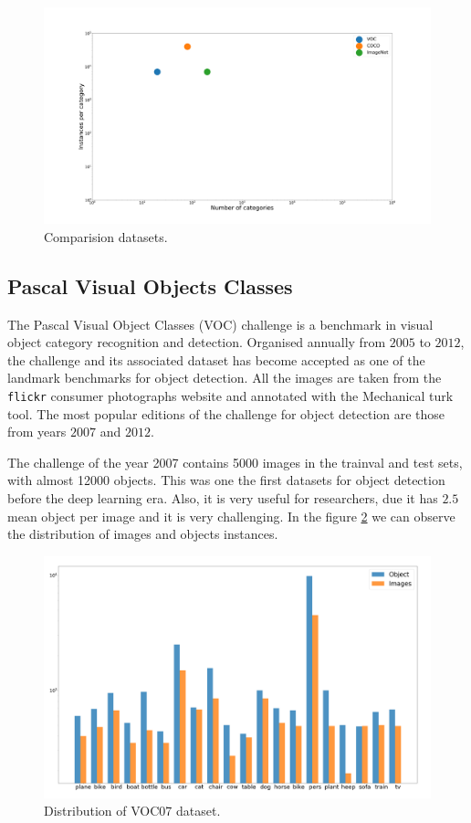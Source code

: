 \begin{figure}[H]
\centering         
\includegraphics[width=15cm]{datasets/sdad2.png}
\caption{Comparision datasets.} \label{instancesCategorydata}
\end{figure}



\subsection{Pascal Visual Objects Classes}

The Pascal Visual Object Classes (VOC) challenge  \cite{voc07} is a benchmark in visual object category recognition and detection. Organised annually from $2005$ to $2012$, the challenge and its associated dataset has become accepted as one of the landmark benchmarks for object detection. All the images are taken from the \texttt{flickr} consumer photographs website and annotated with the Mechanical turk tool. The most popular editions of the challenge for object detection are those from years $2007$ and $2012$.

The challenge of the year 2007 \cite{voc07website} contains 5000 images in the trainval and test sets, with almost 12000 objects. This was one the first datasets for object detection before the deep learning era. Also, it is very useful for researchers, due it has $2.5$ mean object per image and it is very challenging. In the figure \ref{data07} we can observe the distribution of images and objects instances. 

\begin{figure}[hptb]
\centering         
\includegraphics[width=15cm]{datasets/logFinal.png}
\caption{Distribution of VOC07 dataset.} \label{data07}
\end{figure}


